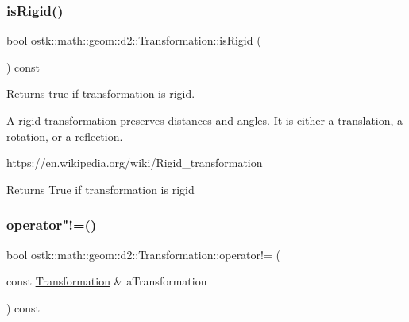 \subsubsection{\texorpdfstring{is\+Rigid()}{isRigid()}}
{\footnotesize\ttfamily bool ostk\+::math\+::geom\+::d2\+::\+Transformation\+::is\+Rigid (\begin{DoxyParamCaption}{ }\end{DoxyParamCaption}) const}



Returns true if transformation is rigid. 

A rigid transformation preserves distances and angles. It is either a translation, a rotation, or a reflection.

https\+://en.wikipedia.\+org/wiki/\+Rigid\+\_\+transformation

\begin{DoxyReturn}{Returns}
True if transformation is rigid 
\end{DoxyReturn}
\mbox{\label{classostk_1_1math_1_1geom_1_1d2_1_1_transformation_ae28c6eae5981de020c50e517c051a5f2}} 
\subsubsection{\texorpdfstring{operator"!=()}{operator!=()}}
{\footnotesize\ttfamily bool ostk\+::math\+::geom\+::d2\+::\+Transformation\+::operator!= (\begin{DoxyParamCaption}\item[{const \hyperlink{classostk_1_1math_1_1geom_1_1d2_1_1_transformation}{Transformation} \&}]{a\+Transformation }\end{DoxyParamCaption}) const}

\mbox{\label{classostk_1_1math_1_1geom_1_1d2_1_1_transformation_ad34d7313a9f489b60f2abbf6738fb97f}} 
